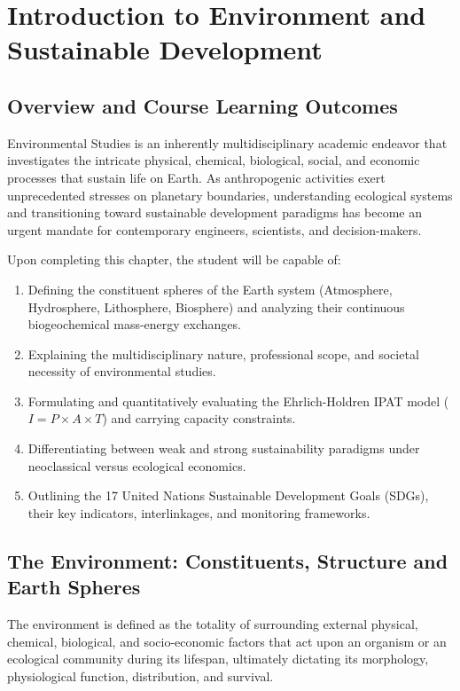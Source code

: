 \chapter{Introduction to Environment and Sustainable Development}
\label{chap:intro-sustainability}

\section{Overview and Course Learning Outcomes}
Environmental Studies is an inherently multidisciplinary academic endeavor that investigates the intricate physical, chemical, biological, social, and economic processes that sustain life on Earth. As anthropogenic activities exert unprecedented stresses on planetary boundaries, understanding ecological systems and transitioning toward sustainable development paradigms has become an urgent mandate for contemporary engineers, scientists, and decision-makers.

\begin{important}
Upon completing this chapter, the student will be capable of:
\begin{enumerate}[leftmargin=1.5em]
    \item Defining the constituent spheres of the Earth system (Atmosphere, Hydrosphere, Lithosphere, Biosphere) and analyzing their continuous biogeochemical mass-energy exchanges.
    \item Explaining the multidisciplinary nature, professional scope, and societal necessity of environmental studies.
    \item Formulating and quantitatively evaluating the Ehrlich-Holdren IPAT model ($I = P \times A \times T$) and carrying capacity constraints.
    \item Differentiating between weak and strong sustainability paradigms under neoclassical versus ecological economics.
    \item Outlining the 17 United Nations Sustainable Development Goals (SDGs), their key indicators, interlinkages, and monitoring frameworks.
\end{enumerate}
\end{important}

\section{The Environment: Constituents, Structure and Earth Spheres}
\begin{definition}[Environment]
The environment is defined as the totality of surrounding external physical, chemical, biological, and socio-economic factors that act upon an organism or an ecological community during its lifespan, ultimately dictating its morphology, physiological function, distribution, and survival.
\end{definition}

